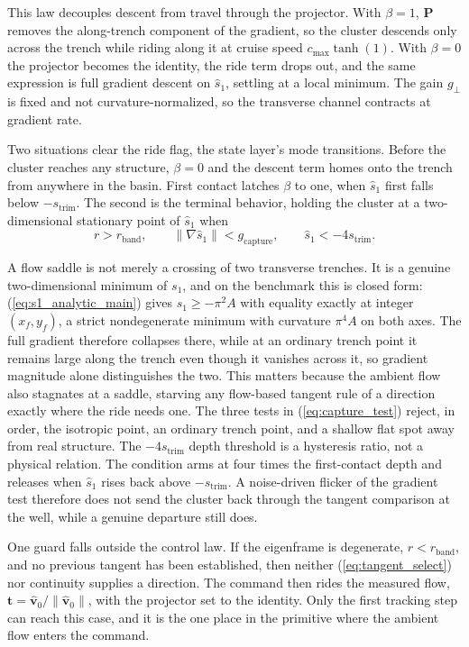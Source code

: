 \documentclass[lettersize,journal]{IEEEtran}
\begin{document}
This law decouples descent from travel through the projector.
With $\beta = 1$, $\mathbf{P}$ removes the along-trench component of the
gradient, so the cluster descends only across the trench while riding
along it at cruise speed $c_{\max}\tanh(1)$. With $\beta = 0$ the
projector becomes the identity, the ride term drops out, and the same
expression is full gradient descent on $\hat{s}_1$, settling at a
local minimum. The gain $g_\perp$ is fixed and not
curvature-normalized, so the transverse channel contracts at gradient
rate.

Two situations clear the ride flag, the state layer's mode
transitions. Before the cluster reaches any structure, $\beta = 0$
and the descent term homes onto the trench from anywhere in the basin.
First contact latches $\beta$ to one, when $\hat{s}_1$
first falls below $-s_{\mathrm{trim}}$. The second is the
terminal behavior, holding the cluster at a two-dimensional
stationary point of $\hat{s}_1$ when
\begin{equation}
    r > r_{\mathrm{band}}, \qquad
    \lVert\nabla\hat{s}_1\rVert < g_{\mathrm{capture}}, \qquad
    \hat{s}_1 < -4 s_{\mathrm{trim}}.
    \label{eq:capture_test}
\end{equation}

A flow saddle is not merely a crossing of two transverse trenches. It is
a genuine two-dimensional minimum of $s_1$, and on the benchmark this
is closed form: (\ref{eq:s1_analytic_main}) gives
$s_1 \geq -\pi^2 A$ with equality exactly at integer $(x_f, y_f)$, a
strict nondegenerate minimum with curvature $\pi^4 A$ on both axes. The
full gradient therefore collapses there, while at an
ordinary trench point it remains large along the trench even
though it vanishes across it, so gradient magnitude alone distinguishes
the two. This matters because the ambient flow also stagnates at a
saddle, starving any flow-based tangent rule of a direction exactly
where the ride needs one.
The three tests in (\ref{eq:capture_test}) reject, in order, the
isotropic point, an ordinary trench point, and a shallow flat spot away
from real structure. The $-4s_{\mathrm{trim}}$ depth
threshold is a hysteresis ratio, not a physical relation. The condition arms at four times the first-contact depth and releases when $\hat{s}_1$ rises back above $-s_{\mathrm{trim}}$. A noise-driven flicker of the gradient test therefore does not send the cluster back through the tangent comparison at the well, while a genuine departure still does.

One guard falls outside the control law. If the eigenframe is
degenerate, $r < r_{\mathrm{band}}$, and no previous tangent has been
established, then neither (\ref{eq:tangent_select}) nor continuity
supplies a direction. The command then rides the measured flow,
$\mathbf{t} = \hat{\mathbf{v}}_0/\|\hat{\mathbf{v}}_0\|$, with the
projector set to the identity. Only the first tracking step can reach
this case, and it is the one place in the primitive where the ambient
flow enters the command.
\end{document}
